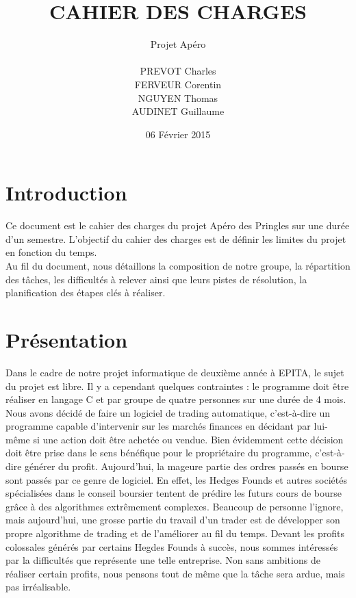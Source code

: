 \documentclass[a4paper,12pt]{article}
\title{CAHIER DES CHARGES}
\author{Projet Apéro \\ \\ PREVOT Charles \\ FERVEUR Corentin \\ NGUYEN Thomas \\ AUDINET Guillaume}
\date{06 Février 2015}
\begin{document}
\begin{titlepage}
\maketitle
\end{titlepage}

\tableofcontents
\newpage

\section{Introduction}
Ce document est le cahier des charges du projet Apéro des Pringles sur une durée d'un semestre.
L'objectif du cahier des charges est de définir les limites du projet en fonction du temps. \\

Au fil du document, nous détaillons la composition de notre groupe, la répartition des tâches, les difficultés à relever ainsi que leurs pistes de résolution, la planification des étapes clés à réaliser.\\

\section{Présentation}
Dans le cadre de notre projet informatique de deuxième année à EPITA, le sujet du projet est libre. Il y a cependant quelques contraintes : le programme doit être réaliser en langage C et par groupe de quatre personnes sur une durée de 4 mois. Nous avons décidé de faire un logiciel de trading automatique, c'est-à-dire un programme capable d'intervenir sur les marchés finances en décidant par lui-même si une action doit être achetée ou vendue. Bien évidemment cette décision doit être prise dans le sens bénéfique pour le propriétaire du programme, c'est-à-dire générer du profit. Aujourd'hui, la mageure partie des ordres passés en bourse sont passés par ce genre de logiciel. En effet, les Hedges Founds et autres sociétés spécialisées dans le conseil boursier tentent de prédire les futurs cours de bourse grâce à des algorithmes extrêmement complexes. Beaucoup de personne l'ignore, mais aujourd'hui, une grosse partie du travail d'un trader est de développer son propre algorithme de trading et de l'améliorer au fil du temps. Devant les profits colossales générés par certains Hegdes Founds à succès, nous sommes intéressés par la difficultés que représente une telle entreprise. Non sans ambitions de réaliser certain profits, nous pensons tout de même que la tâche sera ardue, mais pas irréalisable.
\end{document}
